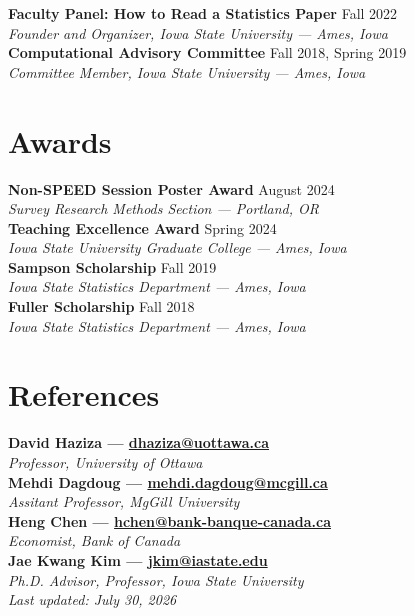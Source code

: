 \documentclass[11pt]{article}
\newcommand{\entry}[3]{%
  \noindent\textbf{#1} \hfill #3\\
  \textit{#2}\\[4pt]
}
\begin{document}
\entry{Faculty Panel: How to Read a Statistics Paper}{Founder and Organizer, Iowa State University --- Ames, Iowa}{Fall 2022}

\entry{Computational Advisory Committee}{Committee Member, Iowa State University --- Ames, Iowa}{Fall 2018, Spring 2019}

\section*{Awards}
\entry{Non-SPEED Session Poster Award}{Survey Research Methods Section --- Portland, OR}{August 2024}
\entry{Teaching Excellence Award}{Iowa State University Graduate College --- Ames, Iowa}{Spring 2024}
\entry{Sampson Scholarship}{Iowa State Statistics Department --- Ames, Iowa}{Fall 2019}
\entry{Fuller Scholarship}{Iowa State Statistics Department --- Ames, Iowa}{Fall 2018}

\section*{References}
\entry{David Haziza --- \href{mailto:dhaziza@uottawa.ca}{dhaziza@uottawa.ca}}{Professor, University of Ottawa}{}
\entry{Mehdi Dagdoug --- \href{mailto:mehdi.dagdoug@mcgill.ca}{mehdi.dagdoug@mcgill.ca}}{Assitant Professor, MgGill University}{}
\entry{Heng Chen --- \href{mailto:hchen@bank-banque-canada.ca}{hchen@bank-banque-canada.ca}}{Economist, Bank of Canada}{}
\entry{Jae Kwang Kim --- \href{mailto:jkim@iastate.edu}{jkim@iastate.edu}}{Ph.D. Advisor, Professor, Iowa State University}{}

\vspace{12pt}
\footnotesize\textit{Last updated: July 30, 2026}
\end{document}
